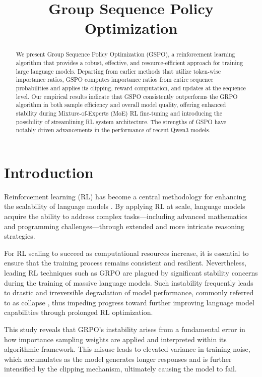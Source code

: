 \title{Group Sequence Policy Optimization}

\begin{abstract}
We present Group Sequence Policy Optimization (GSPO), a reinforcement learning algorithm that provides a robust, effective, and resource-efficient approach for training large language models. Departing from earlier methods that utilize token-wise importance ratios, GSPO computes importance ratios from entire sequence probabilities and applies its clipping, reward computation, and updates at the sequence level. Our empirical results indicate that GSPO consistently outperforms the GRPO algorithm in both sample efficiency and overall model quality, offering enhanced stability during Mixture-of-Experts (MoE) RL fine-tuning and introducing the possibility of streamlining RL system architecture. The strengths of GSPO have notably driven advancements in the performance of recent Qwen3 models.
\end{abstract}

\section{Introduction}
\label{sec:intro}

Reinforcement learning (RL) has become a central methodology for enhancing the scalability of language models \citep{o1,dpsk-r1,qwq32b,qwen3}. By applying RL at scale, language models acquire the ability to address complex tasks—including advanced mathematics and programming challenges—through extended and more intricate reasoning strategies.

For RL scaling to succeed as computational resources increase, it is essential to ensure that the training process remains consistent and resilient. Nevertheless, leading RL techniques such as GRPO \citep{grpo} are plagued by significant stability concerns during the training of massive language models. Such instability frequently leads to drastic and irreversible degradation of model performance, commonly referred to as collapse \citep{qwen3, minimax-m1}, thus impeding progress toward further improving language model capabilities through prolonged RL optimization.

This study reveals that GRPO's instability arises from a fundamental error in how importance sampling weights are applied and interpreted within its algorithmic framework. This misuse leads to elevated variance in training noise, which accumulates as the model generates longer responses and is further intensified by the clipping mechanism, ultimately causing the model to fail.


